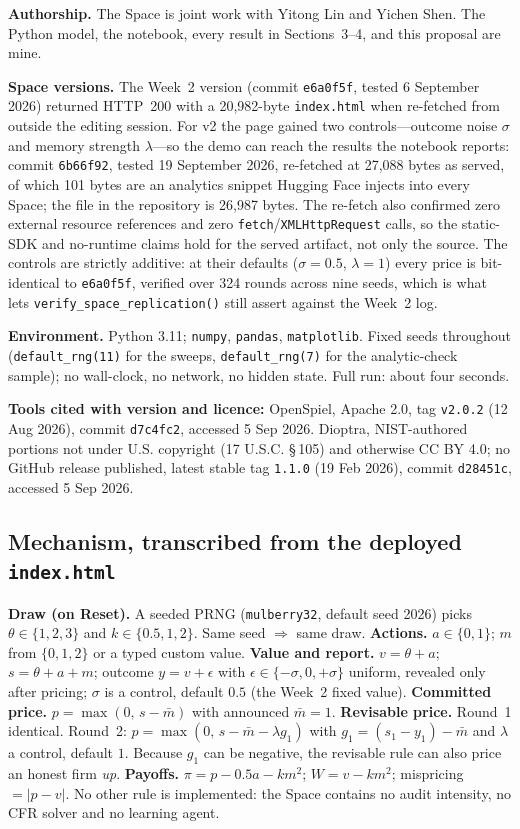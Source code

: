 \textbf{Authorship.} The Space is joint work with Yitong Lin and Yichen Shen.
The Python model, the notebook, every result in Sections~3--4, and this proposal
are mine.

\textbf{Space versions.} The Week~2 version (commit \texttt{e6a0f5f}, tested
6 September 2026) returned HTTP~200 with a 20{,}982-byte \texttt{index.html} when
re-fetched from outside the editing session. For v2 the page gained two
controls---outcome noise $\sigma$ and memory strength $\lambda$---so the demo can
reach the results the notebook reports: commit \texttt{6b66f92}, tested
19 September 2026, re-fetched at 27{,}088 bytes as served, of which 101 bytes are
an analytics snippet Hugging Face injects into every Space; the file in the
repository is 26{,}987 bytes. The re-fetch also confirmed zero external resource
references and zero \texttt{fetch}/\texttt{XMLHttpRequest} calls, so the
static-SDK and no-runtime claims hold for the served artifact, not only the
source. The controls are strictly additive: at their defaults ($\sigma=0.5$,
$\lambda=1$) every price is bit-identical to \texttt{e6a0f5f}, verified over 324
rounds across nine seeds, which is what lets
\texttt{verify\_space\_replication()} still assert against the Week~2 log.

\textbf{Environment.} Python 3.11; \texttt{numpy}, \texttt{pandas},
\texttt{matplotlib}. Fixed seeds throughout (\texttt{default\_rng(11)} for the
sweeps, \texttt{default\_rng(7)} for the analytic-check sample); no wall-clock,
no network, no hidden state. Full run: about four seconds.

\textbf{Tools cited with version and licence:} OpenSpiel, Apache 2.0, tag
\texttt{v2.0.2} (12 Aug 2026), commit \texttt{d7c4fc2}, accessed 5 Sep 2026.
Dioptra, NIST-authored portions not under U.S. copyright (17 U.S.C. \S\,105) and
otherwise CC BY 4.0; no GitHub release published, latest stable tag
\texttt{1.1.0} (19 Feb 2026), commit \texttt{d28451c}, accessed 5 Sep 2026.

\subsection{Mechanism, transcribed from the deployed \texttt{index.html}}
\textbf{Draw (on Reset).} A seeded PRNG (\texttt{mulberry32}, default seed 2026)
picks $\theta\in\{1,2,3\}$ and $k\in\{0.5,1,2\}$. Same seed $\Rightarrow$ same
draw.
\textbf{Actions.} $a\in\{0,1\}$; $m$ from $\{0,1,2\}$ or a typed custom value.
\textbf{Value and report.} $v=\theta+a$; $s=\theta+a+m$; outcome $y=v+\epsilon$
with $\epsilon\in\{-\sigma,0,+\sigma\}$ uniform, revealed only after pricing;
$\sigma$ is a control, default $0.5$ (the Week~2 fixed value).
\textbf{Committed price.} $p=\max(0,\,s-\bar m)$ with announced $\bar m=1$.
\textbf{Revisable price.} Round~1 identical. Round~2:
$p=\max(0,\,s-\bar m-\lambda g_1)$ with $g_1=(s_1-y_1)-\bar m$ and $\lambda$ a
control, default $1$. Because $g_1$ can be negative, the revisable rule can
also price an honest firm \emph{up}.
\textbf{Payoffs.} $\pi=p-0.5a-km^{2}$; $W=v-km^{2}$; mispricing $=|p-v|$. No
other rule is implemented: the Space contains no audit intensity, no CFR solver
and no learning agent.

